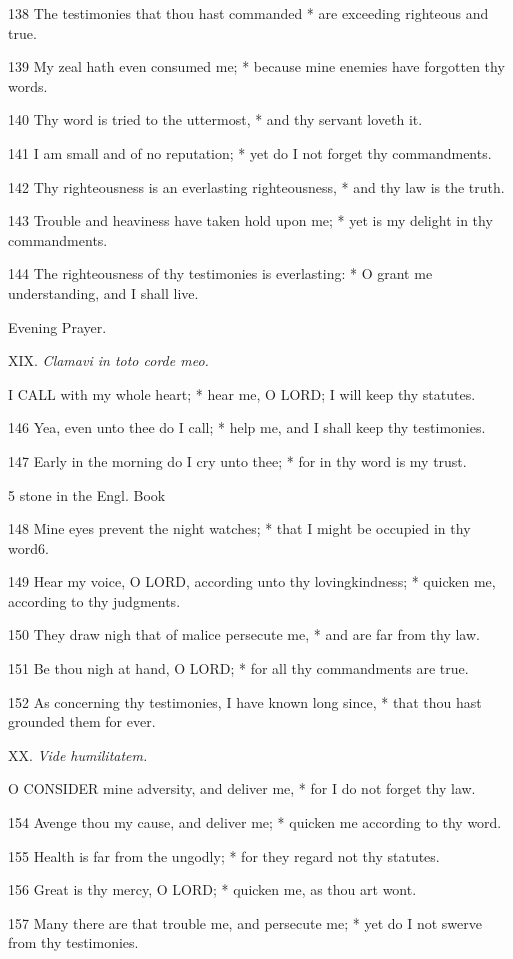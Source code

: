 138 The testimonies that thou hast commanded * are
exceeding righteous and true.

139 My zeal hath even consumed me; * because mine enemies
have forgotten thy words.

140 Thy word is tried to the uttermost, * and thy servant
loveth it.

141 I am small and of no reputation; * yet do I not
forget thy commandments.

142 Thy righteousness is an everlasting righteousness,
* and thy law is the truth.

143 Trouble and heaviness have taken hold upon me;
* yet is my delight in thy commandments.

144 The righteousness of thy testimonies is everlasting:
* O grant me understanding, and I shall live. 

Evening Prayer.

XIX. \emph{Clamavi
in toto corde meo.}

I
CALL with my whole heart; * hear me, O LORD; I will keep thy statutes.

146 Yea, even unto thee do I call; * help me, and I
shall keep thy testimonies.

147 Early in the morning do I cry unto thee; * for
in thy word is my trust. 

5 stone in
the Engl. Book

148 Mine eyes prevent the night watches; * that I might be occupied in thy
word6.

149 Hear my voice, O LORD, according unto thy lovingkindness;
* quicken me, according to thy judgments.

150 They draw nigh that of malice persecute me, * and
are far from thy law.

151 Be thou nigh at hand, O LORD; * for all thy commandments
are true.

152 As concerning thy testimonies, I have known long
since, * that thou hast grounded them for ever.

XX.
\emph{Vide humilitatem.}

O
CONSIDER mine adversity, and deliver me, * for I do not forget thy law.

154 Avenge thou my cause, and deliver me; * quicken
me according to thy word.

155 Health is far from the ungodly; * for they regard
not thy statutes.

156 Great is thy mercy, O LORD; * quicken me, as thou
art wont.

157 Many there are that trouble me, and persecute me;
* yet do I not swerve from thy testimonies.

